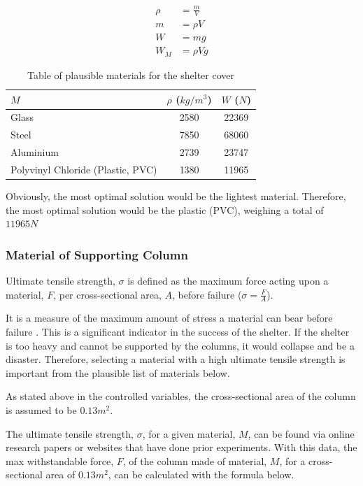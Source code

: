 \documentclass[a4paper,titlepage]{article}
\begin{document}
\begin{align}
    \rho&=\frac{m}V\\
    m&=\rho V\\
    W&=mg\\
    W_M&=\rho Vg
\end{align}

\begin{table}[htbp]
    \centering
    \begin{tabular}{l|c|c}
        $M$ & $\rho$ ($\si{kg/m^3}$) & $W$ ($\si{N}$) \\
        \hline
        Glass & 2580 & 22369 \\
        Steel & 7850 & 68060 \\
        Aluminium & 2739 & 23747 \\
        Polyvinyl Chloride (Plastic, PVC) & 1380 & 11965 \\
    \end{tabular}
    \caption{Table of plausible materials for the shelter cover}
    \label{tab:shelterCoverMaterial}
\end{table}

Obviously, the most optimal solution would be the lightest material. Therefore, the most optimal solution would be the plastic (PVC), weighing a total of $11965\si{N}$

\subsubsection{Material of Supporting Column}

Ultimate tensile strength, $\sigma$ is defined as the maximum force acting upon a material, $F$, per cross-sectional area, $A$, before failure ($\sigma=\frac{F}A$).

It is a measure of the maximum amount of stress a material can bear before failure \cite{velling-uts}. This is a significant indicator in the success of the shelter. If the shelter is too heavy and cannot be supported by the columns, it would collapse and be a disaster. Therefore, selecting a material with a high ultimate tensile strength is important from the plausible list of materials below.

As stated above in the controlled variables, the cross-sectional area of the column is assumed to be $0.13\si{m^2}$.

The ultimate tensile strength, $\sigma$, for a given material, $M$, can be found via online research papers or websites that have done prior experiments. With this data, the max withstandable force, $F$, of the column made of material, $M$, for a cross-sectional area of $0.13\si{m^2}$, can be calculated with the formula below.
\end{document}
